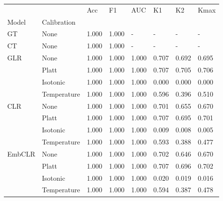 \begin{tabular}{llllllll}
\toprule
 &  & Acc & F1 & AUC & K1 & K2 & Kmax \\
Model & Calibration &  &  &  &  &  &  \\
\midrule
GT & None & 1.000 & 1.000 & - & - & - & - \\
\cline{1-8}
CT & None & 1.000 & 1.000 & - & - & - & - \\
\cline{1-8}
\multirow[t]{4}{*}{GLR} & None & 1.000 & 1.000 & 1.000 & 0.707 & 0.692 & 0.695 \\
 & Platt & 1.000 & 1.000 & 1.000 & 0.707 & 0.705 & 0.706 \\
 & Isotonic & 1.000 & 1.000 & 1.000 & 0.000 & 0.000 & 0.000 \\
 & Temperature & 1.000 & 1.000 & 1.000 & 0.596 & 0.396 & 0.510 \\
\cline{1-8}
\multirow[t]{4}{*}{CLR} & None & 1.000 & 1.000 & 1.000 & 0.701 & 0.655 & 0.670 \\
 & Platt & 1.000 & 1.000 & 1.000 & 0.707 & 0.695 & 0.701 \\
 & Isotonic & 1.000 & 1.000 & 1.000 & 0.009 & 0.008 & 0.005 \\
 & Temperature & 1.000 & 1.000 & 1.000 & 0.593 & 0.388 & 0.477 \\
\cline{1-8}
\multirow[t]{4}{*}{EmbCLR} & None & 1.000 & 1.000 & 1.000 & 0.702 & 0.646 & 0.670 \\
 & Platt & 1.000 & 1.000 & 1.000 & 0.707 & 0.696 & 0.702 \\
 & Isotonic & 1.000 & 1.000 & 1.000 & 0.020 & 0.019 & 0.016 \\
 & Temperature & 1.000 & 1.000 & 1.000 & 0.594 & 0.387 & 0.478 \\
\cline{1-8}
\bottomrule
\end{tabular}
